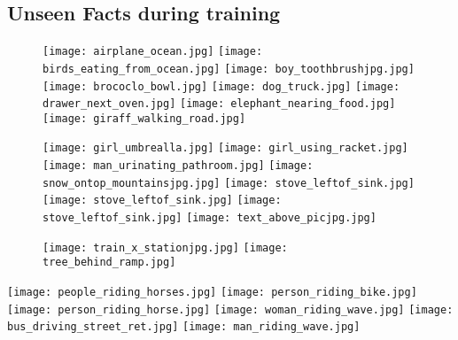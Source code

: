 \documentclass[runningheads]{llncs}
\begin{document}
\subsection{Unseen Facts during training}\begin{figure}[h!]
  \centering
    \texttt{[image: airplane\_ocean.jpg]}
   \texttt{[image: birds\_eating\_from\_ocean.jpg]}
     \texttt{[image: boy\_toothbrushjpg.jpg]}
   \texttt{[image: brococlo\_bowl.jpg]}  \texttt{[image: dog\_truck.jpg]}
   \texttt{[image: drawer\_next\_oven.jpg]}  \texttt{[image: elephant\_nearing\_food.jpg]}
   \texttt{[image: giraff\_walking\_road.jpg]} 
   \end{figure}\begin{figure}[h!] 
    \texttt{[image: girl\_umbrealla.jpg]}
   \texttt{[image: girl\_using\_racket.jpg]}  \texttt{[image: man\_urinating\_pathroom.jpg]}
   \texttt{[image: snow\_ontop\_mountainsjpg.jpg]}
      \texttt{[image: stove\_leftof\_sink.jpg]}
            \texttt{[image: stove\_leftof\_sink.jpg]}      \texttt{[image: stove\_leftof\_sink.jpg]}      \texttt{[image: text\_above\_picjpg.jpg]}     
            \end{figure}\begin{figure}[h!]
             \texttt{[image: train\_x\_stationjpg.jpg]}      \texttt{[image: tree\_behind\_ramp.jpg]}
\end{figure}%
  \centering
    \texttt{[image: people\_riding\_horses.jpg]}
   \texttt{[image: person\_riding\_bike.jpg]}
     \texttt{[image: person\_riding\_horse.jpg]}
   \texttt{[image: woman\_riding\_wave.jpg]} 
         \texttt{[image: bus\_driving\_street\_ret.jpg]}  \texttt{[image: man\_riding\_wave.jpg]}
\end{document}
